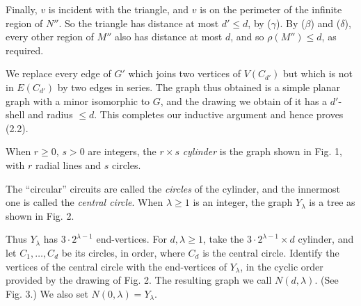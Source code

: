 {Finally, $v$ is incident with the triangle, and $v$ is on the perimeter of the infinite region of
$N''$. So the triangle has distance at most $d' \le d$, by ($\gamma$). By ($\beta$) and ($\delta$),
every other region of $M''$ also has distance at most $d$, and so $\rho(M'') \le d$, as
required.}

We replace every edge of $G'$ which joins two vertices of $V(C_{d'})$ but which is not in $E(C_{d'})$ by two edges in series. The graph thus obtained is a simple planar graph with a minor isomorphic to $G$, and the drawing we obtain of it has a $d'$-shell and radius $\le d$. This completes our inductive argument and hence proves (2.2).

When $r \ge 0$, $s > 0$ are integers, the $r \times s$ \textit{cylinder} is the graph shown in Fig. 1, with $r$ radial lines and $s$ circles.

The ``circular'' circuits are called the \textit{circles} of the cylinder, and the innermost one is called the \textit{central circle}. When $\lambda \ge 1$ is an integer, the graph $Y_\lambda$ is a tree as shown in Fig. 2.

Thus $Y_\lambda$ has $3 \cdot 2^{\lambda-1}$ end-vertices. For $d, \lambda \ge 1$, take the $3 \cdot 2^{\lambda-1} \times d$ cylinder, and let $C_1, \dots, C_d$ be its circles, in order, where $C_d$ is the central circle. Identify the vertices of the central circle with the end-vertices of $Y_\lambda$, in the cyclic order provided by the drawing of Fig. 2. The resulting graph we call $N(d, \lambda)$. (See Fig. 3.) We also set $N(0, \lambda) = Y_\lambda$.

